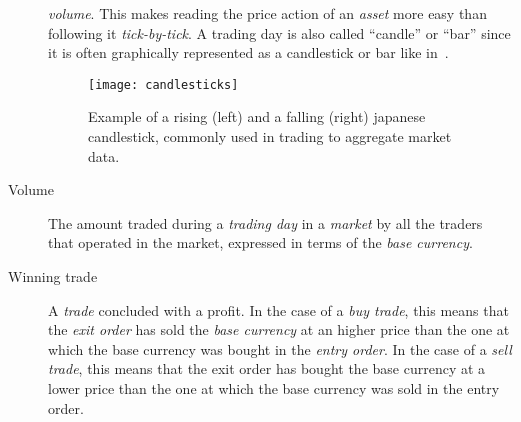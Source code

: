 \begin{description}
		\textit{volume}. This makes reading the price action of an
		\textit{asset} more easy than following it \emph{tick-by-tick}.
		A trading day is also called \enquote{candle} or \enquote{bar}
		since it is often graphically represented as a candlestick or
		bar like in~.
		\begin{figure}[b]
			\centering
			\texttt{[image: candlesticks]}
			\caption{Example of a rising (left) and a falling
				(right) japanese candlestick, commonly used in
				trading to aggregate market
				data.}\label{fig:candlesticks}
		\end{figure}
	\item[Volume] The amount traded during a \textit{trading day} in a
		\textit{market} by all the traders that operated in the market,
		expressed in terms of the \textit{base currency}.
	\item[Winning trade] A \textit{trade} concluded with a profit. In the
		case of a \textit{buy trade}, this means that the \textit{exit
		order} has sold the \textit{base currency} at an higher price
		than the one at which the base currency was bought in the
		\textit{entry order}. In the case of a \textit{sell trade}, this
		means that the exit order has bought the base currency at a
		lower price than the one at which the base currency was sold in
		the entry order.
\end{description}
